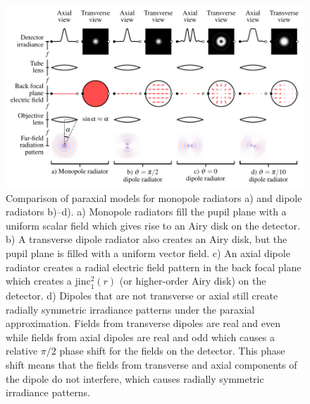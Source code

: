 \documentclass[]{osa-article}
\begin{document}
\begin{figure}[h]
 \centering
   \centering
   \includegraphics[scale=0.8]{../figures/microscope/microscope.pdf}
   \caption{Comparison of paraxial models for monopole radiators a) and dipole
     radiators b)--d). a) Monopole radiators fill the pupil plane with a uniform
     scalar field which gives rise to an Airy disk on the detector. b) A
     transverse dipole radiator also creates an Airy disk, but the pupil plane
     is filled with a uniform vector field. c) An axial dipole radiator creates
     a radial electric field pattern in the back focal plane which creates a
     $\text{jinc}_1^2(r)$ (or higher-order Airy disk) on the detector. d)
     Dipoles that are not transverse or axial still create radially symmetric
     irradiance patterns under the paraxial approximation. Fields from
     transverse dipoles are real and even while fields from axial dipoles are
     real and odd which causes a relative $\pi/2$ phase shift for the fields on
     the detector. This phase shift means that the fields from transverse and
     axial components of the dipole do not interfere, which causes radially
     symmetric irradiance patterns.}
   \label{fig:microscopefig}
 \end{figure}
\end{document}
